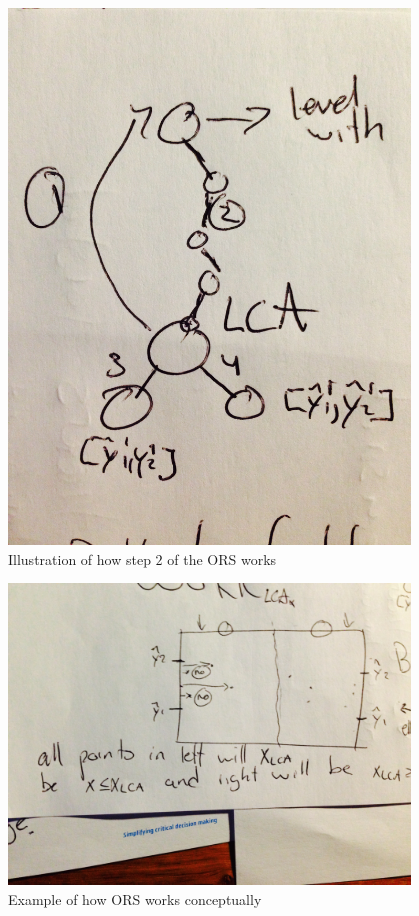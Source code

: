 \begin{figure}[h]
    \centering
    \includegraphics[width=0.95\textwidth]{pictures/ORS_step2.png}
    \caption{Illustration of how step $2$ of the ORS works}
    \label{fig:orstep2}
\end{figure}


\begin{figure}[h]
    \centering
    \includegraphics[width=0.95\textwidth]{pictures/ORS_searchfigure}
    \caption{Example of how ORS works conceptually}
    \label{fig:orsearchfigure}
\end{figure}
\clearpage



